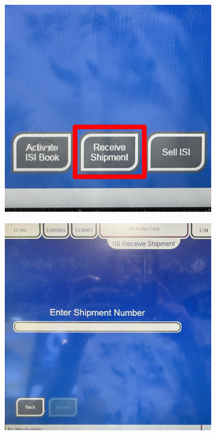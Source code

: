 \documentclass[a4paper, 12pt]{article}
\begin{document}
\begin{enumerate}
\begin{figure}[h]
\begin{subfigure}[b]{0.3\linewidth}
            \includegraphics[width=\linewidth]{images/instantscratchits.JPG} 
        \end{subfigure}
        \hfill
        \begin{subfigure}[b]{0.3\linewidth}
            \centering
            \includegraphics[width=\linewidth]{images/shipment.JPG} 

\end{subfigure}
\end{figure}
\end{enumerate}
\end{document}
